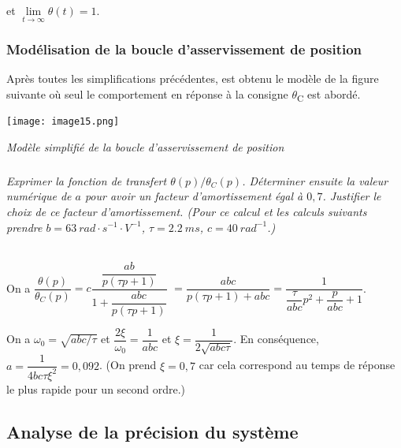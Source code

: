 \begin{multicols}{2}
\begin{corrige}
et $\lim\limits_{t\to\infty} \theta(t) = 1$.
\end{corrige}
\else
\fi

\subsubsection*{Modélisation de la boucle d'asservissement de position}
\ifprof
\else

Après toutes les simplifications précédentes, est obtenu le modèle de la
figure suivante où seul le comportement en réponse à la consigne
$\theta$\textsubscript{C} est abordé.


\begin{center}
\texttt{[image: image15.png]}

\textit{Modèle simplifié de la boucle d'asservissement de
position \label{fig14}}
\end{center}

\fi


\subparagraph{}\textit{Exprimer la fonction de transfert $\theta(p)/\theta_C(p)$.
  Déterminer ensuite la valeur numérique de $a$ pour avoir un facteur
  d'amortissement égal à $0,7$. Justifier le choix de ce facteur
  d'amortissement. (Pour ce calcul et les calculs suivants prendre $b =
  \SI{63}{rad\cdot s^{-1}\cdot V^{-1}}$, $\tau= \SI{2,2}{ms}$, $c = \SI{40}{rad^{-1}}$.)}

\ifprof
\begin{corrige}~\\

On a $\dfrac{\theta(p)}{\theta_C(p)}=c\dfrac{\dfrac{ab}{p\left( \tau p + 1\right)}}{1+\dfrac{abc}{p\left( \tau p + 1\right)}}$
$=\dfrac{{abc}}{p\left( \tau p + 1\right)+{abc}}=\dfrac{1}{ \dfrac{\tau}{abc} p^2 + \dfrac{p}{abc}+1}$.

On a $\omega_0 = \sqrt{abc/\tau}$ et $\dfrac{2\xi}{\omega_0}=\dfrac{1}{abc}$ et 
$\xi=\dfrac{1}{2\sqrt{abc\tau}}$. 
En conséquence, ${a}=\dfrac{1}{4bc\tau\xi^2}=0,092$. (On prend $\xi=0,7$ car cela correspond au temps de réponse le plus rapide pour un second ordre.)
\end{corrige}
\else
\fi
  

\subsection*{Analyse de la précision du système}
\ifprof
\else


\end{multicols}
